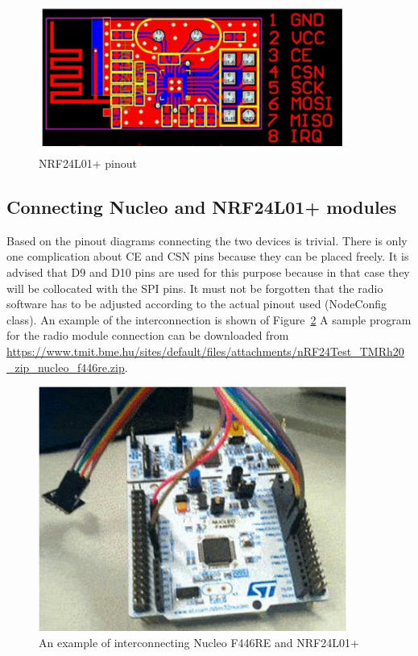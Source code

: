 \documentclass[a4paper]{article}
\begin{document}
\begin{figure}[H]
    \centering
    \includegraphics[width=0.9\textwidth]{figures/radio-pinout.png}
    \caption{NRF24L01+ pinout}
    \label{fig:radio-pinout}
\end{figure}

\subsection{Connecting Nucleo and NRF24L01+ modules}

Based on the pinout diagrams connecting the two devices is trivial. There is only one complication about CE and CSN
pins because they can be placed freely. It is advised that D9 and D10 pins are used for this purpose because in that
case they will be collocated with the SPI pins. It must not be forgotten that the radio software has to be adjusted
according to the actual pinout used (NodeConfig class). An example of the interconnection is shown of
Figure~\ref{fig:radio-nucleo-connection}
A sample program for the radio module connection can be downloaded from
\url{https://www.tmit.bme.hu/sites/default/files/attachments/nRF24Test_TMRh20_zip_nucleo_f446re.zip}.

\begin{figure}[H]
    \centering
    \includegraphics[width=0.9\textwidth]{figures/board-radio-example.png}
    \caption{An example of interconnecting Nucleo F446RE and NRF24L01+}
    \label{fig:radio-nucleo-connection}
\end{figure}
\end{document}
